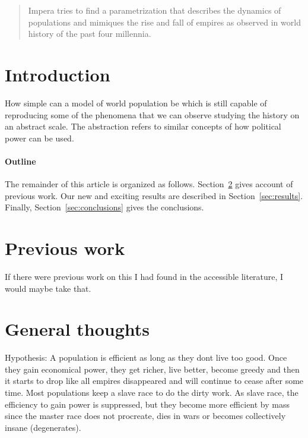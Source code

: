 \documentclass[12pt]{article}
\begin{document}
\maketitle

\begin{abstract}
Impera tries to find a parametrization
that describes the dynamics of populations
and mimiques the rise and fall of empires
as observed in world history of the past four millennia.
\end{abstract}

\section{Introduction}
How simple can a model of world
population be which is still capable
of reproducing some of the phenomena that we
can observe studying the history on an abstract
scale. 
The abstraction refers to similar 
concepts of how political power can be
used.

\paragraph{Outline}
The remainder of this article is organized as follows.
Section~\ref{sec:previous_work} gives account of previous work.
Our new and exciting results are described in Section~\ref{sec:results}.
Finally, Section~\ref{sec:conclusions} gives the conclusions.


\section{Previous work} \label{sec:previous_work}
If there were previous work on this I had found in the
accessible literature, I would maybe take that.

\section{General thoughts} \label{sec:general_thoughts}
Hypothesis: A population is efficient as long as they dont live too good.
Once they gain economical power, they get richer, live better, become
greedy and then it starts to drop like all empires disappeared and 
will continue to cease after some time.
Most populations keep a slave race to do the dirty work.
As slave race, the efficiency to gain power is suppressed,
but they become more efficient by mass since the master race
does not procreate, dies in wars or becomes collectively insane (degenerates).
\end{document}
